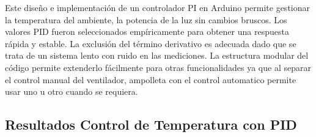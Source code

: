 \documentclass[spanish, a4paper, 11pt]{article}
\begin{document}
Este diseño e implementación de un controlador PI en Arduino permite gestionar la temperatura del ambiente, la potencia de la luz sin cambios bruscos. Los valores PID fueron seleccionados empíricamente para obtener una respuesta rápida y estable. La exclusión del término derivativo es adecuada dado que se trata de un sistema lento con ruido en las mediciones. La estructura modular del código permite extenderlo fácilmente para otras funcionalidades ya que al separar el control manual del ventilador, ampolleta con el control automatico permite usar uno u otro cuando se requiera.

\subsection{Resultados Control de Temperatura con PID}


\end{document}
